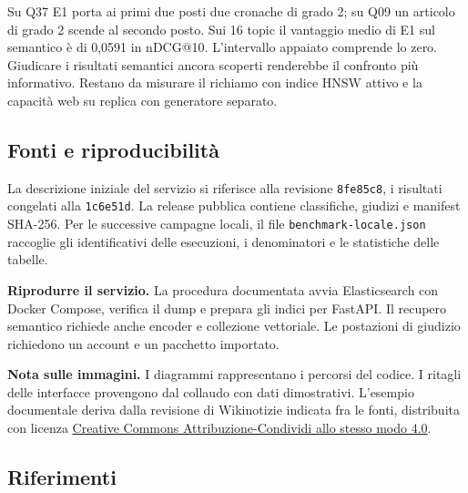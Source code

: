 \documentclass[11pt,a4paper]{article}
\begin{document}
Su Q37 E1 porta ai primi due posti due cronache di grado 2; su Q09 un articolo di grado 2 scende al secondo posto. Sui 16 topic il vantaggio medio di E1 sul semantico è di 0,0591 in nDCG@10. L'intervallo appaiato comprende lo zero. Giudicare i risultati semantici ancora scoperti renderebbe il confronto più informativo. Restano da misurare il richiamo con indice HNSW attivo e la capacità web su replica con generatore separato.

\subsection{Fonti e riproducibilità}\label{fonti-e-riproducibilituxe0}

La descrizione iniziale del servizio si riferisce alla revisione \texttt{8fe85c8}, i risultati congelati alla \texttt{1c6e51d}. La release pubblica contiene classifiche, giudizi e manifest SHA-256. Per le successive campagne locali, il file \texttt{benchmark-locale.json} raccoglie gli identificativi delle esecuzioni, i denominatori e le statistiche delle tabelle.

\textbf{Riprodurre il servizio.} La procedura documentata avvia Elasticsearch con Docker Compose, verifica il dump e prepara gli indici per FastAPI. Il recupero semantico richiede anche encoder e collezione vettoriale. Le postazioni di giudizio richiedono un account e un pacchetto importato.

\textbf{Nota sulle immagini.} I diagrammi rappresentano i percorsi del codice. I ritagli delle interfacce provengono dal collaudo con dati dimostrativi. L'esempio documentale deriva dalla revisione di Wikinotizie indicata fra le fonti, distribuita con licenza \href{https://creativecommons.org/licenses/by-sa/4.0/}{Creative Commons Attribuzione-Condividi allo stesso modo 4.0}.

\subsection{Riferimenti}\label{riferimenti}
\end{document}

